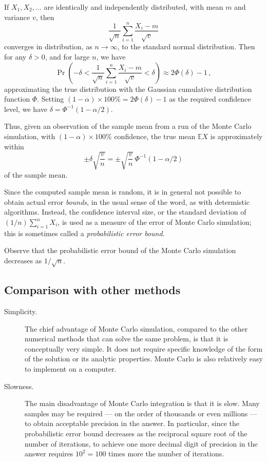 \documentclass[12pt]{article}
\newcommand{\inv}[1]{{#1}^{-1}}
\newcommand{\E}{\mathbb{E}}
\begin{document}
If $X_1, X_2, \dotsc$ are identically and independently distributed,
with mean $m$ and variance $v$,
then
\[
\frac{1}{\sqrt{n}} \sum_{i=1}^n \frac{X_i - m}{\sqrt{v}} 
\]
converges in distribution,
as $n \to \infty$, to the standard normal distribution.
Then for any $\delta > 0$, and for large $n$, we have
\[
\Pr \left( -\delta < \frac{1}{\sqrt n} \sum_{i=1}^n \frac{X_i - m}{\sqrt v}
< \delta \right) \approx 2 \Phi(\delta) - 1\,,
\]
approximating the true distribution with the Gaussian cumulative
distribution function $\Phi$.
Setting $(1-\alpha) \times 100\% = 2\Phi(\delta)-1$ as the required
 confidence level,
we have $\delta = \inv\Phi(1-\alpha/2)$.

Thus, given an observation of the sample mean 
from a run of the Monte Carlo simulation,
with $(1-\alpha) \times 100\%$ confidence,
the true mean $\E X$ is approximately
within
\[
\pm \delta \sqrt{\frac{v}{n}}
=
\pm
\sqrt{\frac{v}{n}} \,
\inv\Phi(1-\alpha/2) 
\]
of the sample mean.

Since the computed sample mean is random,
it is in general not possible to obtain actual error \emph{bounds},
in the usual sense of the word,
as with determistic algorithms.
Instead, the confidence interval size,
or the standard deviation of $(1/n) \sum_{i=1}^n X_i$,
is used as a measure of the error of Monte Carlo simulation;
this is sometimes called a \emph{probabilistic error bound}.

Observe that the probabilistic error bound of 
the Monte Carlo simulation decreases as $1/\sqrt{n}$.

\subsection*{Comparison with other methods}

\begin{description}
\item[Simplicity.]
The chief advantage of Monte Carlo simulation,
compared to the other numerical methods that can solve the same
problem, is that it is conceptually very simple.
It does not require specific knowledge of the form of the solution
or its analytic properties.
Monte Carlo is also relatively easy to implement on a computer.

\item[Slowness.]
The main disadvantage of Monte Carlo integration
is that it is slow.
Many samples may be 
required --- on the order of thousands or even millions ---
to obtain acceptable precision in the answer.
In particular, since the probabilistic error bound
decreases as the reciprocal square root of the number of iterations,
to achieve one more decimal digit of precision
in the answer requires $10^2 = 100$ times more the
number of iterations.
\end{description}
\end{document}
